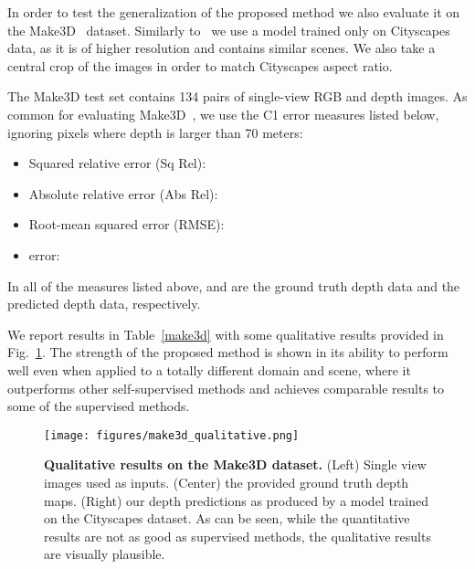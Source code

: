\documentclass[10pt,twocolumn,letterpaper]{article}
\newcommand{\minisection}[1]{\vspace{1mm}\noindent{\textbf{#1}}}
\begin{document}
\minisection{Make3D.}
In order to test the generalization of the proposed method we also evaluate it on the Make3D~\cite{saxena2006learning,saxena20083} dataset. Similarly to~\cite{monodepth17} we use a model trained only on Cityscapes data, as it is of higher resolution and contains similar scenes. We also take a central crop of the images in order to match Cityscapes aspect ratio.

The Make3D test set contains 134 pairs of single-view RGB and depth images. As common for evaluating Make3D~\cite{liu2014discrete}, we use the C1 error measures listed below, ignoring pixels where depth is larger than 70 meters:
\begin{itemize}[nosep]
	\item Squared relative error (Sq Rel): 
	\item Absolute relative error (Abs Rel): 
	\item Root-mean squared error (RMSE): \tiny\normalsize
	\item  error: 
\end{itemize}
In all of the measures listed above,  and  are the ground truth depth data
and the predicted depth data, respectively.

We report results in Table~\ref{make3d} with some qualitative results provided in Fig.~\ref{fig:make3d}.
The strength of the proposed method is shown in its ability to perform well even when applied to a totally different domain and scene, where it outperforms other self-supervised methods and achieves comparable results to some of the supervised methods.

\begin{figure}
	\centering
	\texttt{[image: figures/make3d\_qualitative.png]}
	\caption{{\bf Qualitative results on the Make3D dataset.} (Left) Single view images used as inputs. (Center) the provided ground truth depth maps. (Right) our depth predictions as produced by a model trained on the Cityscapes dataset. As can be seen, while the quantitative results are not as good as supervised methods, the qualitative results are visually plausible.\vspace{-2mm}}
	\label{fig:make3d}
\end{figure}
\end{document}
